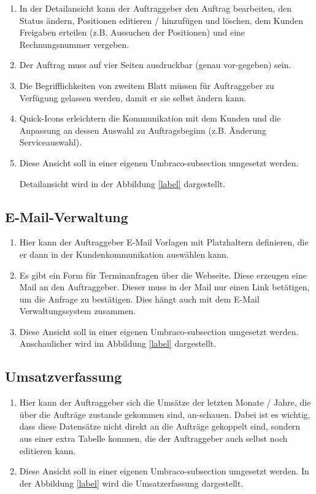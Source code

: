 \begin{enumerate}
	\item In der Detailansicht kann der Auftraggeber den Auftrag bearbeiten, den Status ändern, Positionen editieren / hinzufügen und löschen, dem Kunden Freigaben erteilen (z.B. Aussuchen der Positionen) und eine Rechnungsnummer vergeben.
	\item Der Auftrag muss auf vier Seiten ausdruckbar (genau vor-gegeben) sein.
	\item Die Begrifflichkeiten von zweitem Blatt müssen für Auftraggeber zu Verfügung gelassen werden, damit er sie selbst ändern kann.
	\item Quick-Icons erleichtern die Kommunikation mit dem Kunden und die Anpassung an dessen Auswahl zu Auftragsbeginn (z.B. Änderung Serviceauswahl).
	\item  Diese Ansicht soll in einer eigenen Umbraco-subsection umgesetzt werden.
	
	Detailansicht wird in der Abbildung \ref{label} dargestellt.
\end{enumerate} 


\subsection{E-Mail-Verwaltung}

\begin{enumerate}
	\item Hier kann der Auftraggeber E-Mail Vorlagen mit Platzhaltern definieren, die er dann in der Kundenkommunikation auswählen kann.
	\item Es gibt ein Form für Terminanfragen über die Webseite. Diese erzeugen eine Mail an den Auftraggeber. Dieser muss in der Mail nur einen Link betätigen, um die Anfrage zu bestätigen. Dies hängt auch mit dem E-Mail Verwaltungssystem zusammen.
	\item Diese Ansicht soll in einer eigenen Umbraco-subsection umgesetzt werden.
	Anschaulicher wird im Abbildung \ref{label} dargestellt.
\end{enumerate} 



\subsection{Umsatzverfassung}
\begin{enumerate}
	\item Hier kann der Auftraggeber sich die Umsätze der letzten Monate / Jahre, die über die Aufträge zustande gekommen sind, an-schauen. Dabei ist es wichtig, dass diese Datensätze nicht direkt an die Aufträge gekoppelt sind, sondern aus einer extra Tabelle kommen, die der Auftraggeber auch selbst noch editieren kann.
	\item Diese Ansicht soll in einer eigenen Umbraco-subsection umgesetzt werden.
	In der Abbildung \ref{label} wird die Umsatzerfassung dargestellt.
\end{enumerate} 


